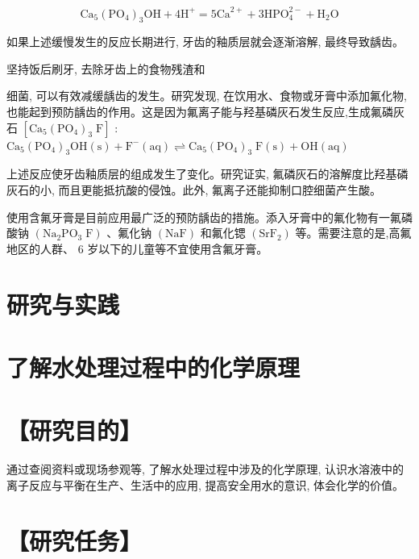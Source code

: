 \documentclass[10pt]{article}
\begin{document}
\[
{\mathrm{{Ca}}}_{5}{\left( {\mathrm{{PO}}}_{4}\right) }_{3}\mathrm{{OH}} + 4{\mathrm{H}}^{ + } = 5{\mathrm{{Ca}}}^{2 + } + 3{\mathrm{{HPO}}}_{4}^{2 - } + {\mathrm{H}}_{2}\mathrm{O}
\]

如果上述缓慢发生的反应长期进行, 牙齿的釉质层就会逐渐溶解, 最终导致龋齿。

坚持饭后刷牙, 去除牙齿上的食物残渣和

细菌, 可以有效减缓龋齿的发生。研究发现, 在饮用水、食物或牙膏中添加氟化物, 也能起到预防龋齿的作用。这是因为氟离子能与羟基磷灰石发生反应,生成氟磷灰石 \(\left\lbrack {{\mathrm{{Ca}}}_{5}{\left( {\mathrm{{PO}}}_{4}\right) }_{3}\mathrm{\;F}}\right\rbrack\) : \({\mathrm{{Ca}}}_{5}{\left( {\mathrm{{PO}}}_{4}\right) }_{3}\mathrm{{OH}}\left( \mathrm{s}\right) + {\mathrm{F}}^{ - }\left( \mathrm{{aq}}\right) \rightleftharpoons {\mathrm{{Ca}}}_{5}{\left( {\mathrm{{PO}}}_{4}\right) }_{3}\mathrm{\;F}\left( \mathrm{s}\right) + \mathrm{{OH}}\left( \mathrm{{aq}}\right)\)

上述反应使牙齿釉质层的组成发生了变化。研究证实, 氟磷灰石的溶解度比羟基磷灰石的小, 而且更能抵抗酸的侵蚀。此外, 氟离子还能抑制口腔细菌产生酸。

使用含氟牙膏是目前应用最广泛的预防龋齿的措施。添入牙膏中的氟化物有一氟磷酸钠 \(\left( {{\mathrm{{Na}}}_{2}{\mathrm{{PO}}}_{3}\mathrm{\;F}}\right)\) 、氟化钠 \(\left( \mathrm{{NaF}}\right)\) 和氟化锶 \(\left( {\mathrm{{SrF}}}_{2}\right)\) 等。需要注意的是,高氟地区的人群、 6 岁以下的儿童等不宜使用含氟牙膏。

\section*{研究与实践}

\section*{了解水处理过程中的化学原理}

\section*{【研究目的】}

通过查阅资料或现场参观等, 了解水处理过程中涉及的化学原理, 认识水溶液中的离子反应与平衡在生产、生活中的应用, 提高安全用水的意识, 体会化学的价值。

\section*{【研究任务】}
\end{document}
